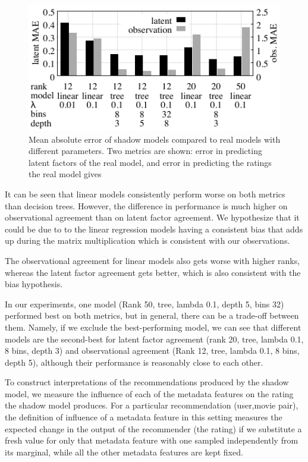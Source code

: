 \begin{figure}
\includegraphics[width=\textwidth]{figures/shadow_parameters_accuracy.pdf}
\caption{\label{table:results:parameters} Mean absolute error of shadow
	models compared to real models with different parameters. Two metrics
	are shown: error in predicting latent factors of the real model, and error
	in predicting the ratings the real model gives}
\end{figure}

It can be seen that linear models consistently perform worse on both
metrics than decision trees. 
However, the difference in performance is much higher on observational
agreement than on latent factor agreement. 
We hypothesize that it could be due to to the linear regression models
having a consistent bias that adds up during the matrix multiplication
which is consistent with our
observations.

The observational agreement for linear models also gets worse with higher ranks,
whereas the latent factor agreement gets better, which is also consistent with the
bias hypothesis.

In our experiments, one model (Rank 50, tree, lambda 0.1, depth 5, bins 32) performed
best on both metrics, but in general, there can be a trade-off between them. Namely,
if we exclude the best-performing model, we can see that different models are the
second-best for latent factor agreement (rank 20, tree, lambda 0.1, 8 bins, depth 3)
and observational agreement (Rank 12, tree, lambda 0.1, 8 bins, depth 5),
although their performance is reasonably close to each other.

To construct interpretations of the recommendations produced by the
shadow model, we measure the influence of each of the metadata
features on the rating the shadow model produces. 
For a particular recommendation (user,movie pair), the definition of
influence of a metadata feature in
this setting measures the expected change in the output of the
recommender (the rating) if we substitute a fresh value for only that
metadata feature with one sampled independently from its marginal,
while all the other metadata features are kept fixed.

